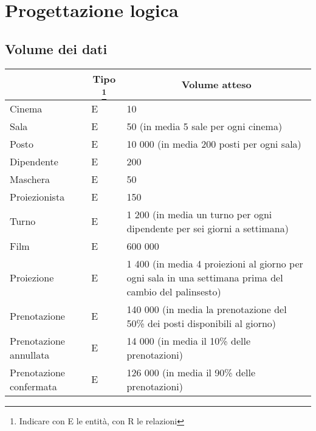\section{Progettazione logica}

\subsection*{Volume dei dati}
%
%
\begin{tabularx}{\linewidth}{|X|l|X|}
    \hline
    \rowcolor{tblhdrcolor}
    \multicolumn{1}{|c|}{\textbf{Concetto nello schema}}
     & \multicolumn{1}{|c|}{\textbf{Tipo}
        \footnote{Indicare con E le entità, con R le relazioni}}
     & \multicolumn{1}{|c|}{\textbf{Volume atteso}}
    \\\hline
    Cinema
     & E
     & 10
    \\\hline
    Sala
     & E
     & 50 (in media 5 sale per ogni cinema)
    \\ \hline
    Posto
     & E
     & 10 000 (in media 200 posti per ogni sala)
    \\ \hline
    Dipendente
     & E
     & 200
    \\ \hline
    Maschera
     & E
     & 50
    \\ \hline
    Proiezionista
     & E
     & 150
    \\ \hline
    Turno
     & E
     & 1 200 (in media un turno per ogni dipendente per sei giorni a settimana)
    \\ \hline
    Film
     & E
     & 600 000
    \\ \hline
    Proiezione
     & E
     & 1 400 (in media 4 proiezioni al giorno per ogni sala in una settimana
    prima del cambio del palinsesto)
    \\ \hline
    Prenotazione
     & E
     & 140 000 (in media la prenotazione del 50\% dei posti disponibili al
    giorno)
    \\ \hline
    Prenotazione annullata
     & E
     & 14 000 (in media il 10\% delle prenotazioni)
    \\ \hline
    Prenotazione confermata
     & E
     & 126 000 (in media il 90\% delle prenotazioni)

\end{tabularx}
